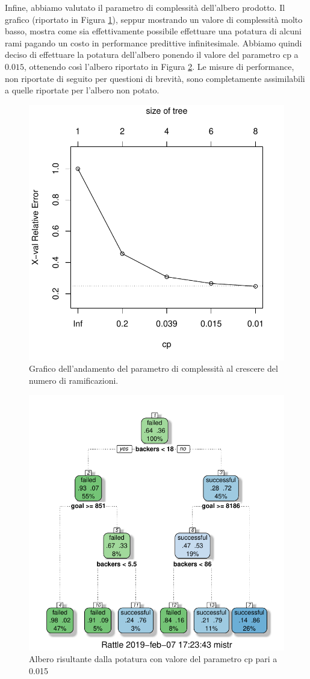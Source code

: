 Infine, abbiamo valutato il parametro di complessità dell'albero prodotto. Il grafico (riportato in Figura \ref{fig:cptree}), seppur mostrando un valore di complessità molto basso, mostra come sia effettivamente possibile effettuare una potatura di alcuni rami pagando un costo in performance predittive infinitesimale. Abbiamo quindi deciso di effettuare la potatura dell'albero ponendo il valore del parametro cp a $0.015$, ottenendo così l'albero riportato in Figura \ref{fig:prunedtree}. Le misure di performance, non riportate di seguito per questioni di brevità, sono completamente assimilabili a quelle riportate per l'albero non potato.
\begin{figure}
	\centering
	\includegraphics[width=0.7\linewidth]{../FinalResults/cptree}
	\caption{Grafico dell'andamento del parametro di complessità al crescere del numero di ramificazioni.}
	\label{fig:cptree}
\end{figure}
\begin{figure}
	\centering
	\includegraphics[width=0.7\linewidth]{../FinalResults/prunedtree}
	\caption{Albero risultante dalla potatura con valore del parametro cp pari a 0.015}
	\label{fig:prunedtree}
\end{figure}
\clearpage
